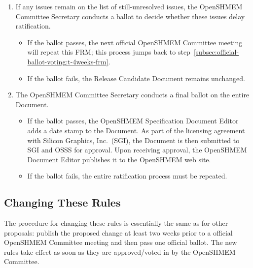 \begin{enumerate}
\begin{enumerate}
    \item If any issues remain on the list of still-unresolved issues,
      the OpenSHMEM Committee Secretary conducts a ballot to decide whether
      these issues delay ratification.
      \begin{itemize}
      \item If the ballot passes, the next official OpenSHMEM Committee meeting
        will repeat this FRM; this process jumps back to
        step~\ref{subsec:official-ballot-voting:t-4weeks-frm}.
      \item If the ballot fails, the Release Candidate Document
        remains unchanged.
      \end{itemize}
    \item The OpenSHMEM Committee Secretary conducts a final ballot on the
      entire Document.
      \begin{itemize}
      \item If the ballot passes, the OpenSHMEM Specification Document Editor adds
        a date stamp to the Document.
        As part of the licensing agreement with Silicon Graphics,
        Inc.~(SGI), the Document is then submitted to SGI and OSSS for
        approval.  Upon receiving approval, the OpenSHMEM Document Editor
        publishes it to the OpenSHMEM web site.
      \item If the ballot fails, the entire ratification process must be
        repeated.
      \end{itemize}
  \end{enumerate}
\end{enumerate}


\subsection{Changing These Rules}

The procedure for changing these rules is essentially the same as for
other proposals: publish the proposed change at least two weeks prior
to a official OpenSHMEM Committee meeting and then pass one official ballot.
The new rules take effect as soon as they are approved/voted in by the
OpenSHMEM Committee.

